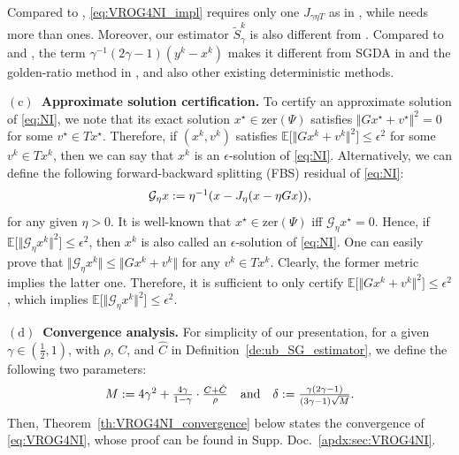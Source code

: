 \documentclass{article}
\newcommand{\norms}[1]{\Vert#1\Vert}
\newcommand{\Expk}[1]{\mathbb{E}\big[#1\big]}
\newcommand{\zer}[1]{\mathrm{zer}(#1)}
\newcommand{\Gc}{\mathcal{G}}
\theoremstyle{plain}
\theoremstyle{definition}
\theoremstyle{remark}
\begin{document}
Compared to \cite{alacaoglu2021stochastic}, \eqref{eq:VROG4NI_impl} requires only one $J_{\gamma\eta T}$ as in \cite{alacaoglu2022beyond}, while \cite{alacaoglu2021stochastic} needs more than ones.
Moreover, our estimator $\widetilde{S}^k_{\gamma}$ is also different from  \cite{alacaoglu2021stochastic}.  
Compared to \cite{beznosikov2023stochastic} and  \cite{alacaoglu2022beyond}, the term $\gamma^{-1}(2\gamma - 1)(y^k - x^k)$ makes it different from SGDA in \cite{beznosikov2023stochastic} and the golden-ratio method in \cite{alacaoglu2022beyond}, and also other existing deterministic methods.

\textbf{$\mathrm{(c)}$~Approximate solution certification.}
To certify an approximate solution of \eqref{eq:NI}, we note that its exact solution $x^{\star}\in\zer{\Psi}$ satisfies $\norms{Gx^{\star} + v^{\star}}^2 = 0$ for some $v^{\star} \in Tx^{\star}$.
Therefore, if $(x^k, v^k)$ satisfies $\Expk{ \norms{Gx^k + v^k}^2} \leq \epsilon^2$ for some $v^k \in Tx^k$, then we can say that $x^k$ is an $\epsilon$-solution of \eqref{eq:NI}.
Alternatively, we can define the following forward-backward splitting (FBS) residual of \eqref{eq:NI}:
\vspace{-1ex}
\begin{equation*} 
\begin{array}{lcl}
\Gc_{\eta}x := \eta^{-1}(x - J_{\eta}(x - \eta Gx)),
\end{array}
\vspace{-0.5ex}
\end{equation*}
for any given $\eta > 0$.
It is well-known that $x^{\star} \in \zer{\Psi}$ iff $\Gc_{\eta}x^{\star} = 0$.
Hence, if $\Expk{ \norms{\Gc_{\eta}x^k}^2 } \leq \epsilon^2$, then $x^k$ is also called an $\epsilon$-solution of \eqref{eq:NI}.
One can easily prove that $\norms{\Gc_{\eta}x^k} \leq \norms{Gx^k + v^k}$ for any $v^k \in Tx^k$.
Clearly,  the former metric implies the latter one.
Therefore, it is sufficient to only certify $\Expk{ \norms{Gx^k + v^k}^2} \leq \epsilon^2$, which implies $\Expk{ \norms{\Gc_{\eta}x^k}^2 } \leq \epsilon^2$.


\textbf{$\mathrm{(d)}$~Convergence analysis.}
For simplicity of our presentation, for a given $\gamma \in \left(\frac{1}{2}, 1\right)$, with $\rho$, $C$, and $\hat{C}$ in Definition~\ref{de:ub_SG_estimator}, we define the following two parameters:
\vspace{-0.75ex}
\begin{equation}\label{eq:VROG4NI_const}
\begin{array}{ll}
M := 4\gamma^2 + \frac{ 4\gamma}{1-\gamma} \cdot \frac{C + \hat{C}}{\rho} \quad \text{and} \quad \delta := \frac{\gamma(2\gamma-1)}{(3\gamma-1)\sqrt{M}}.
\end{array}
\vspace{-0.75ex}
\end{equation}
Then, Theorem~\ref{th:VROG4NI_convergence} below states the convergence of \eqref{eq:VROG4NI}, whose proof can be found in Supp. Doc.~\ref{apdx:sec:VROG4NI}.
\end{document}
